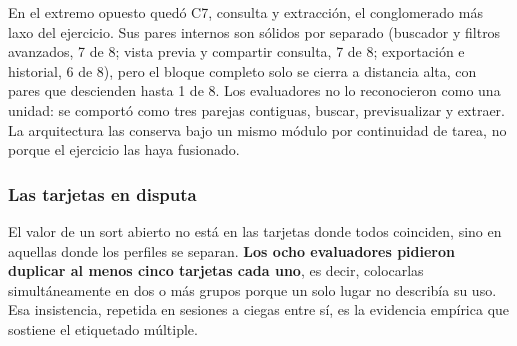 En el extremo opuesto quedó C7, consulta y extracción, el conglomerado más laxo del ejercicio. Sus pares internos son sólidos por separado (buscador y filtros avanzados, 7 de 8; vista previa y compartir consulta, 7 de 8; exportación e historial, 6 de 8), pero el bloque completo solo se cierra a distancia alta, con pares que descienden hasta 1 de 8. Los evaluadores no lo reconocieron como una unidad: se comportó como tres parejas contiguas, buscar, previsualizar y extraer. La arquitectura las conserva bajo un mismo módulo por continuidad de tarea, no porque el ejercicio las haya fusionado.

\subsubsection{Las tarjetas en disputa}
El valor de un sort abierto no está en las tarjetas donde todos coinciden, sino en aquellas donde los perfiles se separan. \textbf{Los ocho evaluadores pidieron duplicar al menos cinco tarjetas cada uno}, es decir, colocarlas simultáneamente en dos o más grupos porque un solo lugar no describía su uso. Esa insistencia, repetida en sesiones a ciegas entre sí, es la evidencia empírica que sostiene el etiquetado múltiple.


